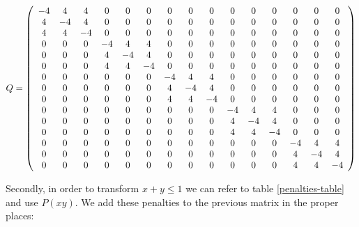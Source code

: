 $$
Q = 
\left(
\begin{array}{*{15}c}
	-4 & 4 & 4 & 0 & 0 & 0 & 0 & 0 & 0 & 0 & 0 & 0 & 0 & 0 & 0 \\
	4 & -4 & 4 & 0 & 0 & 0 & 0 & 0 & 0 & 0 & 0 & 0 & 0 & 0 & 0 \\
	4 & 4 & -4 & 0 & 0 & 0 & 0 & 0 & 0 & 0 & 0 & 0 & 0 & 0 & 0 \\
	0 & 0 & 0 & -4 & 4 & 4 & 0 & 0 & 0 & 0 & 0 & 0 & 0 & 0 & 0 \\
	0 & 0 & 0 & 4 & -4 & 4 & 0 & 0 & 0 & 0 & 0 & 0 & 0 & 0 & 0 \\
	0 & 0 & 0 & 4 & 4 & -4 & 0 & 0 & 0 & 0 & 0 & 0 & 0 & 0 & 0 \\
	0 & 0 & 0 & 0 & 0 & 0 & -4 & 4 & 4 & 0 & 0 & 0 & 0 & 0 & 0 \\
	0 & 0 & 0 & 0 & 0 & 0 & 4 & -4 & 4 & 0 & 0 & 0 & 0 & 0 & 0 \\
	0 & 0 & 0 & 0 & 0 & 0 & 4 & 4 & -4 & 0 & 0 & 0 & 0 & 0 & 0 \\
	0 & 0 & 0 & 0 & 0 & 0 & 0 & 0 & 0 & -4 & 4 & 4 & 0 & 0 & 0 \\
	0 & 0 & 0 & 0 & 0 & 0 & 0 & 0 & 0 & 4 & -4 & 4 & 0 & 0 & 0 \\
	0 & 0 & 0 & 0 & 0 & 0 & 0 & 0 & 0 & 4 & 4 & -4 & 0 & 0 & 0 \\
	0 & 0 & 0 & 0 & 0 & 0 & 0 & 0 & 0 & 0 & 0 & 0 & -4 & 4 & 4 \\
	0 & 0 & 0 & 0 & 0 & 0 & 0 & 0 & 0 & 0 & 0 & 0 & 4 & -4 & 4 \\
	0 & 0 & 0 & 0 & 0 & 0 & 0 & 0 & 0 & 0 & 0 & 0 & 4 & 4 & -4 
\end{array}
\right)
$$

Secondly, in order to transform $x + y \leq 1$ we can refer to table \ref{penalties-table} and use $P(xy)$. We add these penalties to the previous matrix in the proper places:

